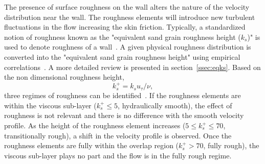 The presence of surface roughness on the wall alters the nature of the velocity distribution near the wall. The roughness elements will introduce new turbulent fluctuations in the flow increasing the skin friction. Typically, a standardized notion of roughness known as the "equivalent sand grain roughness height ($k_s$)" is used to denote roughness of a wall~\cite{nikuradse1950laws, SAroughorig,schlichting2016boundary}. A given physical roughness distribution is converted into the "equivalent sand grain roughness height" using empirical correlations~\cite{braslow1958simplified,dirling1973method,grabow1975surface}. A more detailed review is presented in section~\ref{ssec:eqks}. 
Based on the non dimensional roughness height, 
\begin{equation}
k_s^+ = k_s u_{\tau}/\nu, 
\label{eq:kpluseq}
\end{equation}
three regimes of roughness can be identified~\cite{schlichting2016boundary}.
If the roughness elements are within the viscous sub-layer ($k_s^+ \leq 5$, hydraulically smooth), the effect of roughness is not relevant and there is no difference with the smooth velocity profile. As the height of the roughness element increases ($5 \leq k_s^+ \leq 70 $, transitionally rough), a shift in the velocity profile is observed. Once the roughness elements are fully within the overlap region ($k_s^+ > 70$, fully rough), the viscous sub-layer plays no part and the flow is in the fully rough regime.  
